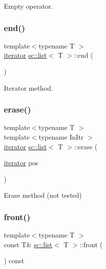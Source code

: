 Empty operator. 

\mbox{\label{classsc_1_1list_a48429f0cf3d990fa6dfd5140e6aa95a7}} 
\subsubsection{\texorpdfstring{end()}{end()}}
{\footnotesize\ttfamily template$<$typename T $>$ \\
\hyperlink{classsc_1_1list_1_1iterator}{iterator} \hyperlink{classsc_1_1list}{sc\+::list}$<$ T $>$\+::end (\begin{DoxyParamCaption}{ }\end{DoxyParamCaption})\hspace{0.3cm}{\ttfamily [inline]}}



Iterator method. 

\mbox{\label{classsc_1_1list_a1bc9bb828cea4b1d35cd9f00adef6387}} 
\subsubsection{\texorpdfstring{erase()}{erase()}}
{\footnotesize\ttfamily template$<$typename T $>$ \\
template$<$typename In\+Itr $>$ \\
\hyperlink{classsc_1_1list_1_1iterator}{iterator} \hyperlink{classsc_1_1list}{sc\+::list}$<$ T $>$\+::erase (\begin{DoxyParamCaption}\item[{\hyperlink{classsc_1_1list_1_1iterator}{iterator}}]{pos }\end{DoxyParamCaption})\hspace{0.3cm}{\ttfamily [inline]}}



Erase method (not tested) 

\mbox{\label{classsc_1_1list_a5e27dee267cd155aaeb87698a2f63da5}} 
\subsubsection{\texorpdfstring{front()}{front()}}
{\footnotesize\ttfamily template$<$typename T $>$ \\
const T\& \hyperlink{classsc_1_1list}{sc\+::list}$<$ T $>$\+::front (\begin{DoxyParamCaption}{ }\end{DoxyParamCaption}) const\hspace{0.3cm}{\ttfamily [inline]}}



